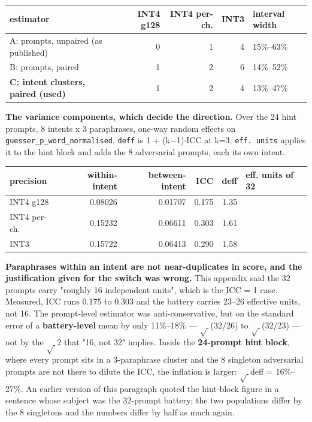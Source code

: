 \begin{table}[t]
\centering\footnotesize
\begin{tabularx}{\textwidth}{>{\hsize=1.000\hsize\raggedright\arraybackslash}Xrrrl}
\toprule
estimator & INT4 g128 & INT4 per-ch. & INT3 & interval width \\
\midrule
A: prompts, unpaired (as published) & 0 & 1 & 4 & 15\%--63\% \\
B: prompts, paired & 1 & 2 & 6 & 14\%--52\% \\
\textbf{C: intent clusters, paired (used)} & 1 & 2 & 4 & 13\%--47\% \\
\bottomrule
\end{tabularx}
\end{table}

\textbf{The variance components, which decide the direction.} Over the 24 hint prompts, 8 intents x 3 paraphrases, one-way random effects on \texttt{guesser\_\allowbreak{}p\_\allowbreak{}word\_\allowbreak{}normalised}. \texttt{deff} is 1 + (k$-$1)$\cdot$ICC at k=3; \texttt{eff. units} applies it to the hint block and adds the 8 adversarial prompts, each its own intent.

\begin{table}[t]
\centering\footnotesize
\begin{tabularx}{\textwidth}{lrrrr>{\hsize=1.000\hsize\raggedright\arraybackslash}X}
\toprule
precision & within-intent & between-intent & ICC & deff & eff. units of 32 \\
\midrule
INT4 g128 & 0.08026 & 0.01707 & 0.175 & 1.35 & 26 \\
INT4 per-ch. & 0.15232 & 0.06611 & 0.303 & 1.61 & 23 \\
INT3 & 0.15722 & 0.06413 & 0.290 & 1.58 & 23 \\
\bottomrule
\end{tabularx}
\end{table}

\textbf{Paraphrases within an intent are not near-duplicates in score, and the justification given for the switch was wrong.} This appendix said the 32 prompts carry "roughly 16 independent units", which is the ICC = 1 case. Measured, ICC runs 0.175 to 0.303 and the battery carries 23--26 effective units, not 16. The prompt-level estimator was anti-conservative, but on the standard error of a \textbf{battery-level} mean by only 11\%--18\% --- $\sqrt{\ }$(32/26) to $\sqrt{\ }$(32/23) --- not by the $\sqrt{\ }$2 that "16, not 32" implies. Inside the \textbf{24-prompt hint block}, where every prompt sits in a 3-paraphrase cluster and the 8 singleton adversarial prompts are not there to dilute the ICC, the inflation is larger: $\sqrt{\ }$deff = 16\%--27\%. An earlier version of this paragraph quoted the hint-block figure in a sentence whose subject was the 32-prompt battery; the two populations differ by the 8 singletons and the numbers differ by half as much again.

